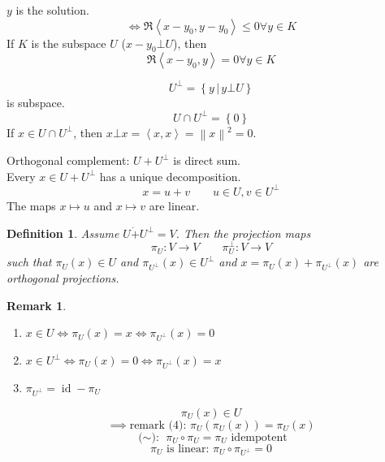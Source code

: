 \documentclass[a4paper]{article}
\newcounter{lecref}[section]
\numberwithin{lecref}{section}
\newtheorem{definition}[lecref]{Definition}
\newtheorem*{Remark}{Remark}
\newcommand{\set}[1]{\left\{#1\right\}}
\newcommand{\setdef}[2]{\left\{\left.#1\,\right|\,#2\right\}}
\newcommand{\ip}[2]{\left\langle#1,#2\right\rangle} %
\newcommand{\norm}[1]{\left\|#1\right\|}
\begin{document}
$y$ is the solution.
\[ \iff \Re\ip{x-y_0}{y - y_0} \leq 0 \forall y \in K \]
If $K$ is the subspace $U$ ($x - y_0 \bot U$), then
\[ \Re\ip{x - y_0}{y} = 0 \forall y \in K \]

\[ U^\bot = \setdef{y}{y \bot U} \]
is subspace.
\[ U \cap U^\bot = \set{0} \]
If $x \in U \cap U^\bot$, then $x \bot x = \ip{x}{x} = \norm{x}^2 = 0$.

Orthogonal complement: $U + U^\bot$ is direct sum. \\
Every $x \in U + U^\bot$ has a unique decomposition.
\[ x = u + v \qquad u \in U, v \in U^\bot \]
The maps $x \mapsto u$ and $x \mapsto v$ are linear.

\begin{definition}
  Assume $U \dot+ U^\bot = V$.
  Then the projection maps
  \[ \pi_U: V \to V \qquad \pi_U^\bot: V \to V \]
  such that $\pi_U(x) \in U$ and $\pi_{U^\bot}(x) \in U^\bot$ and $x = \pi_U(x) + \pi_{U^\bot}(x)$ are orthogonal projections.
\end{definition}

\begin{Remark}
  \begin{enumerate}
    \item $x \in U \iff \pi_U(x) = x \iff \pi_{U^\bot}(x) = 0$
    \item $x \in U^\bot \iff \pi_U(x) = 0 \iff \pi_{U^\bot}(x) = x$
    \item $\pi_{U^\bot} = \operatorname{id} - \pi_U$
  \end{enumerate}
\end{Remark}

\[ \pi_U(x) \in U \]
\[ \implies \text{remark (4): } \pi_U(\pi_U(x)) = \pi_U(x) \]
\[ \text{($\sim$): } \pi_U \circ \pi_U = \pi_U \text{ idempotent} \]
\[ \pi_U \text{ is linear: } \pi_U \circ \pi_{U^\bot} = 0 \]
\end{document}
